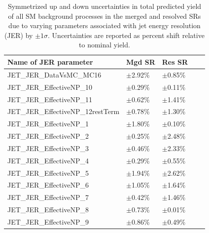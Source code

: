 \begin{table}[ht]
\caption{\label{tab:systs_total_bkg_JET_JER_SR} Symmetrized up and down uncertainties in total predicted yield of all SM background processes in the merged and resolved SRs due to varying parameters associated with jet energy resolution (JER) by \(\pm1\sigma\). Uncertainties are reported as percent shift relative to nominal yield.}
\footnotesize{
\begin{tabular}{l l l l l }
\toprule
\textbf{Name of JER parameter} & \textbf{Mgd SR} & \textbf{Res SR}\tabularnewline
\midrule
\midrule
JET\_JER\_DataVsMC\_MC16 & \(\pm\)2.92\% &\(\pm\)0.85\% \tabularnewline
\midrule
JET\_JER\_EffectiveNP\_10 & \(\pm\)0.29\% &\(\pm\)0.11\% \tabularnewline
\midrule
JET\_JER\_EffectiveNP\_11 & \(\pm\)0.62\% &\(\pm\)1.41\% \tabularnewline
\midrule
JET\_JER\_EffectiveNP\_12restTerm & \(\pm\)0.78\% &\(\pm\)1.30\% \tabularnewline
\midrule
JET\_JER\_EffectiveNP\_1 & \(\pm\)1.80\% &\(\pm\)0.10\% \tabularnewline
\midrule
JET\_JER\_EffectiveNP\_2 & \(\pm\)0.25\% &\(\pm\)2.48\% \tabularnewline
\midrule
JET\_JER\_EffectiveNP\_3 & \(\pm\)0.46\% &\(\pm\)2.33\% \tabularnewline
\midrule
JET\_JER\_EffectiveNP\_4 & \(\pm\)0.29\% &\(\pm\)0.55\% \tabularnewline
\midrule
JET\_JER\_EffectiveNP\_5 & \(\pm\)1.94\% &\(\pm\)2.62\% \tabularnewline
\midrule
JET\_JER\_EffectiveNP\_6 & \(\pm\)1.05\% &\(\pm\)1.64\% \tabularnewline
\midrule
JET\_JER\_EffectiveNP\_7 & \(\pm\)0.42\% &\(\pm\)1.46\% \tabularnewline
\midrule
JET\_JER\_EffectiveNP\_8 & \(\pm\)0.73\% &\(\pm\)0.01\% \tabularnewline
\midrule
JET\_JER\_EffectiveNP\_9 & \(\pm\)0.86\% &\(\pm\)0.49\% \tabularnewline
\bottomrule
\end{tabular}}
\end{table}

